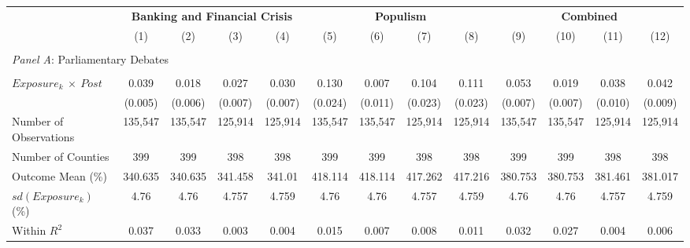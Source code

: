 \begin{tabular}{l*{1}cccccccccccc}
\toprule
& \multicolumn{4}{c}{\textbf{Banking and Financial Crisis}}
& \multicolumn{4}{c}{\textbf{Populism}}
& \multicolumn{4}{c}{\textbf{Combined}}
\\ 
& \multicolumn{1}{c}{(1)}
& \multicolumn{1}{c}{(2)}
& \multicolumn{1}{c}{(3)}
& \multicolumn{1}{c}{(4)}
& \multicolumn{1}{c}{(5)}
& \multicolumn{1}{c}{(6)}
& \multicolumn{1}{c}{(7)}
& \multicolumn{1}{c}{(8)}
& \multicolumn{1}{c}{(9)}
& \multicolumn{1}{c}{(10)}
& \multicolumn{1}{c}{(11)}
& \multicolumn{1}{c}{(12)}
\\ 
\midrule

\\ 
\multicolumn{13}{l}{\textit{Panel A}: 
Parliamentary Debates}
\\ \\

$ Exposure_{k}\ \times \ Post $&       0.039\sym{***}&       0.018\sym{***}&       0.027\sym{***}&       0.030\sym{***}&       0.130\sym{***}&       0.007         &       0.104\sym{***}&       0.111\sym{***}&       0.053\sym{***}&       0.019\sym{***}&   
   0.038\sym{***}&       0.042\sym{***}\\
           &     (0.005)         &     (0.006)         &     (0.007)         &     (0.007)         &     (0.024)         &     (0.011)         &     (0.023)         &     (0.023)         &     (0.007)         &     (0.007)         &     (0.010)         &
    (0.009)         \\
Number of Observations&     135,547         &     135,547         &     125,914         &     125,914         &     135,547         &     135,547         &     125,914         &     125,914         &     135,547         &     135,547         &     125,914
        &     125,914         \\
Number of Counties&         399         &         399         &         398         &         398         &    399         &         399         &         398         &         398         &         399         &         399         &         398    
    &         398         \\
Outcome Mean (\%)&     340.635         &     340.635         &     341.458         &      341.01         &     418.114         &     418.114         &     417.262         &     417.216         &     380.753         &     380.753         &     381.461     
   &     381.017         \\
$ sd\left(Exposure_k\right) $ (\%)&        4.76         &        4.76         &       4.757         &       4.759         &        4.76         &        4.76         &       4.757         &       4.759         &        4.76         &        4.76         &
      4.757         &       4.759         \\
Within $ R^2 $&       0.037         &       0.033         &       0.003         &       0.004         &       0.015         &       0.007         &       0.008         &       0.011         &       0.032         &       0.027         &       0.004        
&       0.006         \\


\end{tabular}
